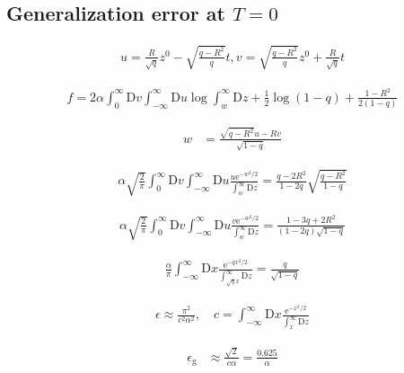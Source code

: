 \documentclass{article}
\begin{document}
\subsection{Generalization error at \(T=0\)}

\begin{align*}
u=\frac{R}{\sqrt{q}} z^{0}-\sqrt{\frac{q-R^{2}}{q}} t, v=\sqrt{\frac{q-R^{2}}{q}} z^{0}+\frac{R}{\sqrt{q}} t
\tag{8.41}
\end{align*}

\begin{align*}
f=2 \alpha \int_{0}^{\infty} \mathrm{D} v \int_{-\infty}^{\infty} \mathrm{D} u \log \int_{w}^{\infty} \mathrm{D} z+\frac{1}{2} \log (1-q)+\frac{1-R^{2}}{2(1-q)}
\tag{8.42}
\end{align*}

\begin{align*}
w &= \frac{\sqrt{q - R^{2}} u - R v}{\sqrt{1 - q}} \tag{8.43}
\end{align*}

\begin{align*}
\alpha \sqrt{\frac{2}{\pi}} \int_{0}^{\infty} \mathrm{D} v \int_{-\infty}^{\infty} \mathrm{D} u \frac{u \mathrm{e}^{-w^{2} / 2}}{\int_{w}^{\infty} \mathrm{D} z}=\frac{q-2 R^{2}}{1-2 q} \sqrt{\frac{q-R^{2}}{1-q}}
\tag{8.44}
\end{align*}

\begin{align*}
\alpha \sqrt{\frac{2}{\pi}} \int_{0}^{\infty} \mathrm{D} v \int_{-\infty}^{\infty} \mathrm{D} u \frac{v \mathrm{e}^{-w^{2} / 2}}{\int_{w}^{\infty} \mathrm{D} z}=\frac{1-3 q+2 R^{2}}{(1-2 q) \sqrt{1-q}}
\tag{8.45}
\end{align*}

\begin{align*}
\frac{\alpha}{\pi} \int_{-\infty}^{\infty} \mathrm{D} x \frac{\mathrm{e}^{-q x^{2} / 2}}{\int_{\sqrt{q} x}^{\infty} \mathrm{D} z}=\frac{q}{\sqrt{1-q}} \tag{8.46}
\end{align*}

\begin{align*}
\epsilon \approx \frac{\pi^{2}}{c^{2} \alpha^{2}}, \quad c=\int_{-\infty}^{\infty} \mathrm{D} x \frac{\mathrm{e}^{-x^{2} / 2}}{\int_{x}^{\infty} \mathrm{D} z} \tag{8.47}
\end{align*}

\begin{align*}
\epsilon_{\mathrm{g}} &\approx \frac{\sqrt{2}}{c \alpha} = \frac{0.625}{\alpha}
\tag{8.48}
\end{align*}
\end{document}
